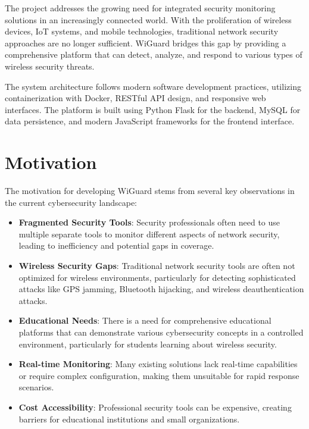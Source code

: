 \documentclass[12pt,a4paper]{report}
\begin{document}
The project addresses the growing need for integrated security monitoring solutions in an increasingly connected world. With the proliferation of wireless devices, IoT systems, and mobile technologies, traditional network security approaches are no longer sufficient. WiGuard bridges this gap by providing a comprehensive platform that can detect, analyze, and respond to various types of wireless security threats.

The system architecture follows modern software development practices, utilizing containerization with Docker, RESTful API design, and responsive web interfaces. The platform is built using Python Flask for the backend, MySQL for data persistence, and modern JavaScript frameworks for the frontend interface.

\section{Motivation}

The motivation for developing WiGuard stems from several key observations in the current cybersecurity landscape:

\begin{itemize}
    \item \textbf{Fragmented Security Tools}: Security professionals often need to use multiple separate tools to monitor different aspects of network security, leading to inefficiency and potential gaps in coverage.
    
    \item \textbf{Wireless Security Gaps}: Traditional network security tools are often not optimized for wireless environments, particularly for detecting sophisticated attacks like GPS jamming, Bluetooth hijacking, and wireless deauthentication attacks.
    
    \item \textbf{Educational Needs}: There is a need for comprehensive educational platforms that can demonstrate various cybersecurity concepts in a controlled environment, particularly for students learning about wireless security.
    
    \item \textbf{Real-time Monitoring}: Many existing solutions lack real-time capabilities or require complex configuration, making them unsuitable for rapid response scenarios.
    
    \item \textbf{Cost Accessibility}: Professional security tools can be expensive, creating barriers for educational institutions and small organizations.
\end{itemize}
\end{document}
